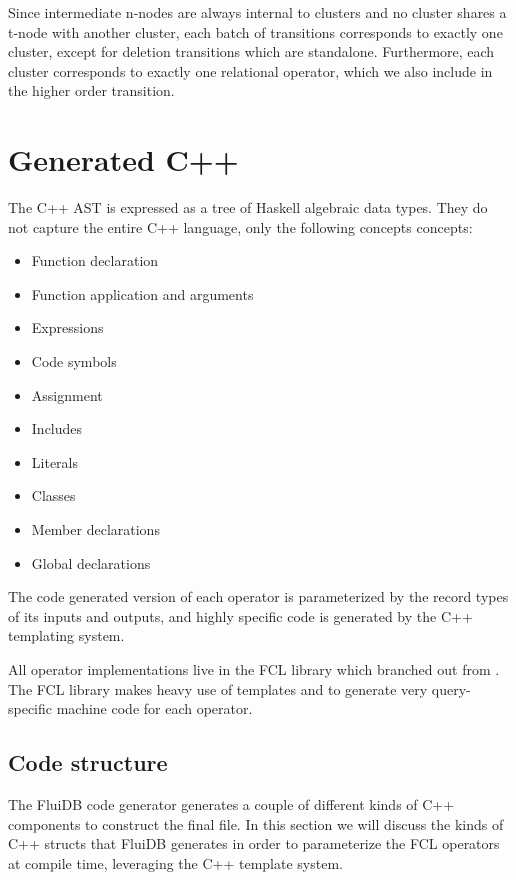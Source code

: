 Since intermediate n-nodes are always internal to clusters and no
cluster shares a t-node with another cluster, each batch of
transitions corresponds to exactly one cluster, except for deletion
transitions which are standalone. Furthermore, each cluster
corresponds to exactly one relational operator, which we also include
in the higher order transition.

\section{Generated C++}

The C++ AST is expressed as a tree of Haskell algebraic data
types. They do not capture the entire C++ language, only the following
concepts concepts:

\begin{itemize}
\item Function declaration
\item Function application and arguments
\item Expressions
\item Code symbols
\item Assignment
\item Includes
\item Literals
\item Classes
\item Member declarations
\item Global declarations
\end{itemize}

The code generated version of each operator is parameterized by the
record types of its inputs and outputs, and highly specific code is
generated by the C++ templating system.

All operator implementations live in the FCL library which
branched out from \cite{krikellasGeneratingCodeHolistic2010}. The FCL
library makes heavy use of templates and  to generate
very query-specific machine code for each operator.

\subsection{Code structure}

The FluiDB code generator generates a couple of different kinds of C++
components to construct the final file. In this section we will
discuss the kinds of C++ structs that FluiDB generates in order to
parameterize the FCL operators at compile time, leveraging the C++
template system.

